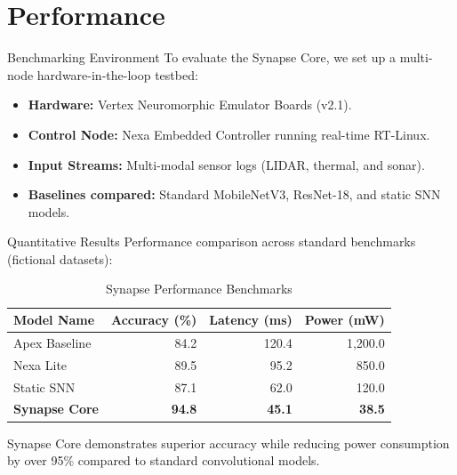 \section{Performance}

\begin{frame}{Benchmarking Environment}
  To evaluate the Synapse Core, we set up a multi-node hardware-in-the-loop testbed:
  \begin{itemize}
    \item \textbf{Hardware:} Vertex Neuromorphic Emulator Boards (v2.1).
    \item \textbf{Control Node:} Nexa Embedded Controller running real-time RT-Linux.
    \item \textbf{Input Streams:} Multi-modal sensor logs (LIDAR, thermal, and sonar).
    \item \textbf{Baselines compared:} Standard MobileNetV3, ResNet-18, and static SNN models.
  \end{itemize}
\end{frame}

\begin{frame}{Quantitative Results}
  Performance comparison across standard benchmarks (fictional datasets):
  
  \begin{table}
    \centering
    \caption{Synapse Performance Benchmarks}
    \begin{tabular}{lrrr}
      \toprule
      Model Name & Accuracy (\%) & Latency (ms) & Power (mW) \\
      \midrule
      Apex Baseline & 84.2 & 120.4 & 1,200.0 \\
      Nexa Lite     & 89.5 & 95.2  & 850.0 \\
      Static SNN    & 87.1 & 62.0  & 120.0 \\
      \textbf{Synapse Core} & \textbf{94.8} & \textbf{45.1}  & \textbf{38.5} \\
      \bottomrule
    \end{tabular}
  \end{table}
  
  Synapse Core demonstrates superior accuracy while reducing power consumption by over 95\% compared to standard convolutional models.
\end{frame}

